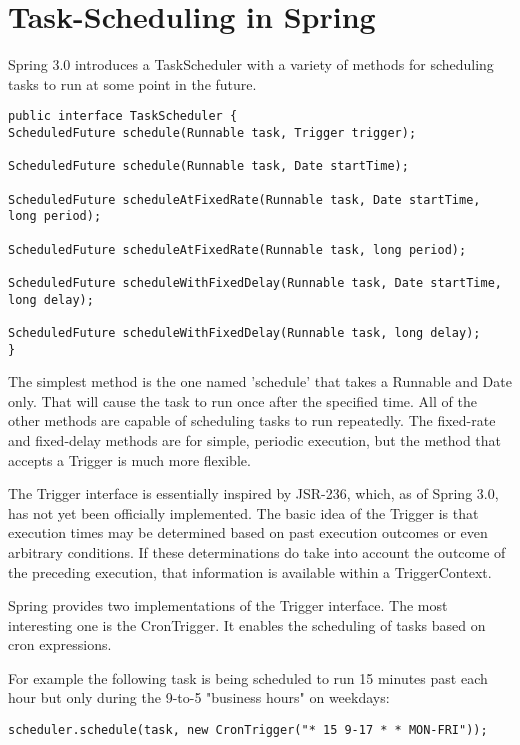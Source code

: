 
\section{Task-Scheduling in Spring}

Spring 3.0 introduces a TaskScheduler with a variety of methods for scheduling tasks to run at some point in the future.
\begin{lstlisting}
public interface TaskScheduler {
ScheduledFuture schedule(Runnable task, Trigger trigger);

ScheduledFuture schedule(Runnable task, Date startTime);

ScheduledFuture scheduleAtFixedRate(Runnable task, Date startTime, long period);

ScheduledFuture scheduleAtFixedRate(Runnable task, long period);

ScheduledFuture scheduleWithFixedDelay(Runnable task, Date startTime, long delay);

ScheduledFuture scheduleWithFixedDelay(Runnable task, long delay);
}
\end{lstlisting}

The simplest method is the one named 'schedule' that takes a Runnable and Date only. 
That will cause the task to run once after the specified time. All of the other methods are capable of scheduling tasks to run repeatedly. 
The fixed-rate and fixed-delay methods are for simple, periodic execution, but the method that accepts a Trigger is much more flexible.

The Trigger interface is essentially inspired by JSR-236, which, as of Spring 3.0, has not yet been officially implemented. 
The basic idea of the Trigger is that execution times may be determined based on past execution outcomes or even arbitrary conditions. 
If these determinations do take into account the outcome of the preceding execution, that information is available within a TriggerContext.

Spring provides two implementations of the Trigger interface. The most interesting one is the CronTrigger. 
It enables the scheduling of tasks based on cron expressions. 

For example the following task is being scheduled to run 15 minutes past each hour but only during the 9-to-5 "business hours" on weekdays:
\begin{lstlisting}
scheduler.schedule(task, new CronTrigger("* 15 9-17 * * MON-FRI"));
\end{lstlisting}

